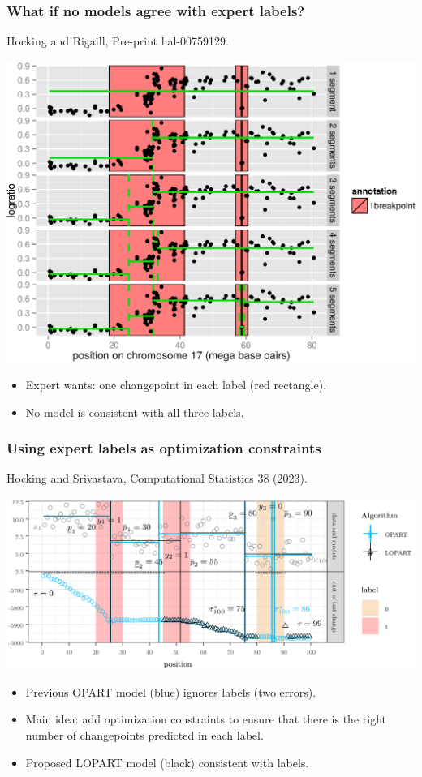 \documentclass{beamer}
\begin{document}
\begin{frame}
  \frametitle{What if no models agree with expert labels?}
  Hocking and Rigaill, Pre-print hal-00759129.

  \includegraphics[width=0.8\linewidth]{SegAnnot-motivation}

  \begin{itemize}
  \item Expert wants: one changepoint in each label (red rectangle).
  \item No model is consistent with all three labels.
  \end{itemize}
\end{frame}

\begin{frame}
  \frametitle{Using expert labels as optimization constraints}
  Hocking and Srivastava, Computational Statistics 38 (2023).

  \includegraphics[width=\linewidth]{LOPART-notation}

  \begin{itemize}
  \item Previous OPART model (blue) ignores labels (two errors).
  \item Main idea: add optimization constraints to ensure that there
    is the right number of changepoints predicted in each label.
  \item Proposed LOPART model (black) consistent with labels.
  \end{itemize}
\end{frame}
\end{document}
